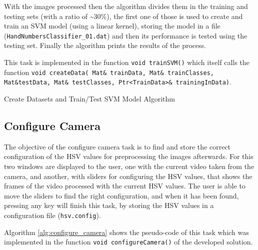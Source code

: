 \documentclass[a4paper,10pt,english]{article}
\begin{document}
        With the images processed then the algorithm divides them in the training and testing sets (with a ratio of \textasciitilde{}30\%), the first one of those is used to create and train an SVM model (using a linear kernel), storing the model in a file (\texttt{HandNumbersClassifier\_01.dat}) and then its performance is tested using the testing set. Finally the algorithm prints the results of the process.
        
        This task is implemented in the function \texttt{void trainSVM()} which itself calls the function \texttt{void createData( Mat\& trainData, Mat\& trainClasses, Mat\&testData, Mat\& testClasses, Ptr<TrainData>\& trainingInData)}.
        
        \begin{algorithm}[H]
            \BlankLine
            \caption{Create Datasets and Train/Test SVM Model Algorithm} \label{alg:svm_model}
        \end{algorithm}
        
        \subsection{Configure Camera}
        
        The objective of the configure camera task is to find and store the correct configuration of the HSV values for preprocessing the images afterwards. For this two windows are displayed to the user, one with the current video taken from the camera, and another, with sliders for configuring the HSV values, that shows the frames of the video processed with the current HSV values. The user is able to move the sliders to find the right configuration, and when it has been found, pressing any key will finish this task, by storing the HSV values in a configuration file (\texttt{hsv.config}).
        
        Algorithm \ref{alg:configure_camera} shows the pseudo-code of this task which was implemented in the function \texttt{void configureCamera()} of the developed solution.
        
\end{document}
